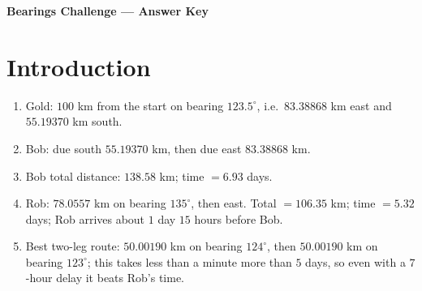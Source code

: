 \documentclass{article}
\begin{document}
\begin{center}
{\Large\bfseries Bearings Challenge --- Answer Key}
\end{center}

\section*{Introduction}
\begin{enumerate}
\item Gold: \(100\) km from the start on bearing \(123.5^\circ\), i.e.\ \(83.38868\) km east and \(55.19370\) km south.
\item Bob: due south \(55.19370\) km, then due east \(83.38868\) km.
\item Bob total distance: \(138.58\) km; time \(=6.93\) days.
\item Rob: \(78.0557\) km on bearing \(135^\circ\), then east. Total \(=106.35\) km; time \(=5.32\) days; Rob arrives about \(1\) day \(15\) hours before Bob.
\item Best two-leg route: \(50.00190\) km on bearing \(124^\circ\), then \(50.00190\) km on bearing \(123^\circ\); this takes less than a minute more than \(5\) days, so even with a \(7\)-hour delay it beats Rob's time.
\end{enumerate}
\end{document}

